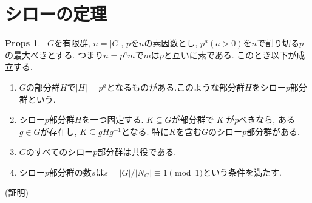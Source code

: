\documentclass[dvipdfmx]{jsarticle}
\theoremstyle{definition}
\newtheorem{props}{Props}
\numberwithin{equation}{section}
\numberwithin{props}{section}
\numberwithin{definition}{section}
\numberwithin{note}{section}
\begin{document}
\section{シローの定理}
\begin{props}~\label{props::shiro}
     $G$を有限群, $n= \lvert G\rvert$, $p$を$n$の素因数とし, $p^a(a>0)$を$n$で割り切る$p$の最大べきとする. つまり$n=p^a m$で$m$は$p$と互いに素である. このとき以下が成立する.
     \begin{enumerate}
          \item $G$の部分群$H$で$\lvert H\rvert=p^a$となるものがある.このような部分群$H$をシロー$p$部分群という.
          \item シロー$p$部分群$H$を一つ固定する. $K\subseteq G$が部分群で$\lvert K\rvert$が$p$べきなら, ある$g\in G$が存在し, $K\subseteq gHg^{-1}$となる. 特に$K$を含む$G$のシロー$p$部分群がある.
          \item $G$のすべてのシロー$p$部分群は共役である.
          \item シロー$p$部分群の数$s$は$s=\lvert G\rvert/\lvert N_G\rvert\equiv 1 \pmod 1$という条件を満たす.
     \end{enumerate}
\end{props}
(証明)
\end{document}
